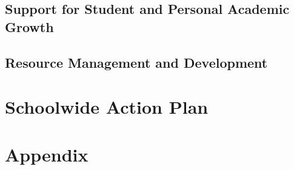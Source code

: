 \documentclass{report}
\begin{document}
\section{Support for Student and Personal Academic Growth}
\section{Resource Management and Development}
\chapter{Schoolwide Action Plan}
\chapter{Appendix}
\listoffigures
\end{document}
